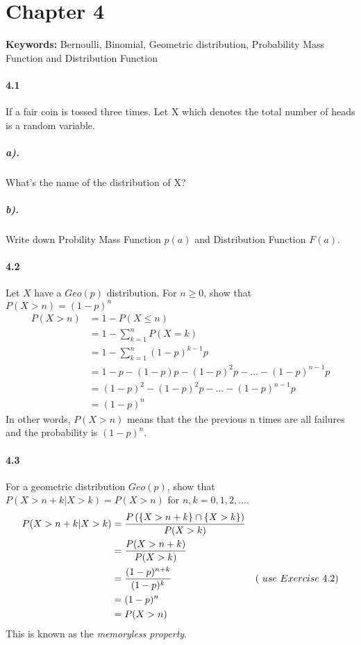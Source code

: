 \documentclass[11pt]{article} %
\begin{document}
\section{Chapter 4}
\textbf{Keywords: } Bernoulli, Binomial, Geometric distribution, Probability Mass Function and Distribution Function
\paragraph*{4.1} If a fair coin is tossed three times. Let X which denotes the total number of heads is a random variable. 
\subparagraph*{a).} What's the name of the distribution of X?
\subparagraph*{b).} Write down Probility Mass Function $p(a)$ and Distribution Function $F(a)$.

\paragraph*{4.2} Let $X$ have a $Geo(p)$ distribution. For $n \geq 0$, show that $P(X > n) = (1-p)^n$
\begin{align*}
P( X > n) &  = 1 - P(X \leq n) \\
& = 1 - \sum_{k=1}^n P(X=k) \\
& = 1 - \sum_{k=1}^n (1-p)^{k-1}p \\
& = 1 - p - (1-p)p - (1-p)^2p - \ldots - (1-p)^{n-1}p \\
& = (1-p)^2 - (1-p)^2p - \ldots - (1-p)^{n-1}p \\
& = (1-p)^n 
\end{align*}
In other words, $P(X>n)$ means that the the previous n times are all failures and the probability is $(1-p)^n$. 

\paragraph*{4.3} For a geometric distribution $Geo(p)$, show that $P(X> n + k | X > k) = P(X > n)$ for $n, k = 0, 1, 2, \ldots$. 
\begin{align*}
P(X> n + k | X > k) & = \frac{P \left( \{X > n + k\}\cap \{X > k\}\right) }{P(X > k)} & \\
& = \frac{P(X > n + k)}{P(X > k)} & \\
& = \frac{(1-p)^{n+k}}{(1-p)^k}& \text(\ use\  Exercise\ 4.2) \\
& = (1-p)^n & \\
& = P(X>n)
\end{align*}
This is known as the {\it memoryless property}. 
\end{document}
